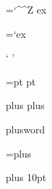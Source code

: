 \p@

\abovedisplayskip=`\^^Z ex

\abovedisplayskip=`\a ex


\thinspace=5pt

\negthinspace
\enspace
\enskip
\quad
\qquad
\smallskip
\medskip
\bigskip
\space
\empty
\null
\lq
\rq
\lbrack
\rbrack

\jota

\jot=pt
\jot=5pt pt

\jot=5pt plus plus

\jot=5pt plusword

\jot=plus

\jot=5pt \relax plus 10pt

